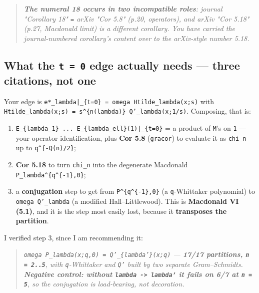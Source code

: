 \documentclass[11pt,a4paper]{article}
\begin{document}
\begin{quote}\itshape \textbf{The numeral 18 occurs in two incompatible roles}: journal "Corollary 18" \mbox{\texttt{=}} arXiv "Cor 5.8" (p.20, operators), and arXiv "Cor 5.18" (p.27, Macdonald limit) is a \emph{different corollary}. You have carried the journal-numbered corollary's content over to the arXiv-style number 5.18.\end{quote}

\subsection*{What the \mbox{\texttt{t = 0}} edge actually needs --- three citations, not one}

Your edge is \mbox{\texttt{e*\_lambda|\_\{t=0\} = omega Htilde\_lambda(x;s)}} with \mbox{\texttt{Htilde\_lambda(x;s) = s\textasciicircum{}\{n(lambda)\} Q'\_lambda(x;1/s)}}. Composing, that is:

\begin{enumerate}
\item \mbox{\texttt{E\_\{lambda\_1\} ... E\_\{lambda\_ell\}(1)|\_\{t=0\}}} = a product of \mbox{\texttt{M}}'s on \mbox{\texttt{1}} --- your operator identification, plus \textbf{Cor 5.8} (\mbox{\texttt{gracor}}) to evaluate it as \mbox{\texttt{chi\_n}} up to \mbox{\texttt{q\textasciicircum{}\{-Q(n)/2\}}};
\item \textbf{Cor 5.18} to turn \mbox{\texttt{chi\_n}} into the degenerate Macdonald \mbox{\texttt{P\_lambda\textasciicircum{}\{q\textasciicircum{}\{-1\},0\}}};
\item a \textbf{conjugation} step to get from \mbox{\texttt{P\textasciicircum{}\{q\textasciicircum{}\{-1\},0\}}} (a \mbox{\texttt{q}}-Whittaker polynomial) to \mbox{\texttt{omega Q'\_lambda}} (a modified Hall--Littlewood). This is \textbf{Macdonald VI (5.1)}, and it is the step most easily lost, because it \textbf{transposes the partition}.
\end{enumerate}

I verified step 3, since I am recommending it:

\begin{quote}\itshape \mbox{\texttt{omega P\_lambda(x;q,0) = Q'\_\{lambda'\}(x;q)}} --- \textbf{17/17 partitions, \mbox{\texttt{n = 2..5}}}, with \mbox{\texttt{q}}-Whittaker and \mbox{\texttt{Q'}} built by two separate Gram--Schmidts. \textbf{Negative control: without \mbox{\texttt{lambda -> lambda'}} it fails on 6/7 at \mbox{\texttt{n = 5}}}, so the conjugation is load-bearing, not decoration.\end{quote}
\end{document}
